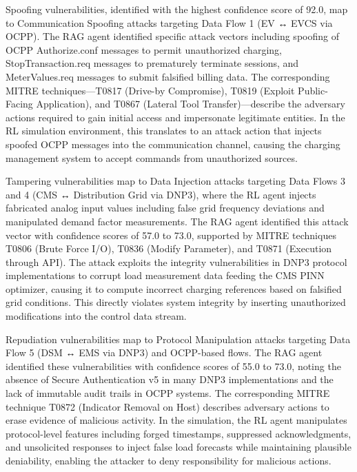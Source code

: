 Spoofing vulnerabilities, identified with the highest confidence score of 92.0, map to Communication Spoofing attacks targeting Data Flow 1 (EV ↔ EVCS via OCPP). The RAG agent identified specific attack vectors including spoofing of OCPP Authorize.conf messages to permit unauthorized charging, StopTransaction.req messages to prematurely terminate sessions, and MeterValues.req messages to submit falsified billing data. The corresponding MITRE techniques—T0817 (Drive-by Compromise), T0819 (Exploit Public-Facing Application), and T0867 (Lateral Tool Transfer)—describe the adversary actions required to gain initial access and impersonate legitimate entities. In the RL simulation environment, this translates to an attack action that injects spoofed OCPP messages into the communication channel, causing the charging management system to accept commands from unauthorized sources.

Tampering vulnerabilities map to Data Injection attacks targeting Data Flows 3 and 4 (CMS ↔ Distribution Grid via DNP3), where the RL agent injects fabricated analog input values including false grid frequency deviations and manipulated demand factor measurements. The RAG agent identified this attack vector with confidence scores of 57.0 to 73.0, supported by MITRE techniques T0806 (Brute Force I/O), T0836 (Modify Parameter), and T0871 (Execution through API). The attack exploits the integrity vulnerabilities in DNP3 protocol implementations to corrupt load measurement data feeding the CMS PINN optimizer, causing it to compute incorrect charging references based on falsified grid conditions. This directly violates system integrity by inserting unauthorized modifications into the control data stream.

Repudiation vulnerabilities map to Protocol Manipulation attacks targeting Data Flow 5 (DSM ↔ EMS via DNP3) and OCPP-based flows. The RAG agent identified these vulnerabilities with confidence scores of 55.0 to 73.0, noting the absence of Secure Authentication v5 in many DNP3 implementations and the lack of immutable audit trails in OCPP systems. The corresponding MITRE technique T0872 (Indicator Removal on Host) describes adversary actions to erase evidence of malicious activity. In the simulation, the RL agent manipulates protocol-level features including forged timestamps, suppressed acknowledgments, and unsolicited responses to inject false load forecasts while maintaining plausible deniability, enabling the attacker to deny responsibility for malicious actions.

